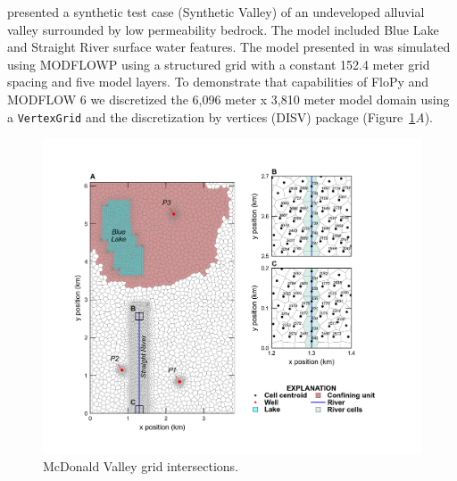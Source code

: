 \documentclass[11pt, oneside]{article}  	%
\begin{document}
\citep{hill1998} presented a synthetic test case (Synthetic Valley) of an undeveloped alluvial valley surrounded by low permeability bedrock. The model included Blue Lake and Straight River surface water features. The model presented in \cite{hill1998} was simulated using MODFLOWP \citep{hill1992computer} using a structured grid with a constant 152.4 meter grid spacing and five model layers. To demonstrate that capabilities of FloPy and MODFLOW 6 we discretized the 6,096 meter x 3,810 meter model domain using a \texttt{VertexGrid} and the discretization by vertices (DISV) package (Figure~\ref{fig:mvgrid}\textit{A}).


\begin{figure}[ht!]
	\begin{center}
		\includegraphics{figures/mv_voronoi_river_discretization.png}
	\end{center}
	\caption{McDonald Valley grid intersections.}
	\label{fig:mvgrid}
\end{figure}

\end{document}
